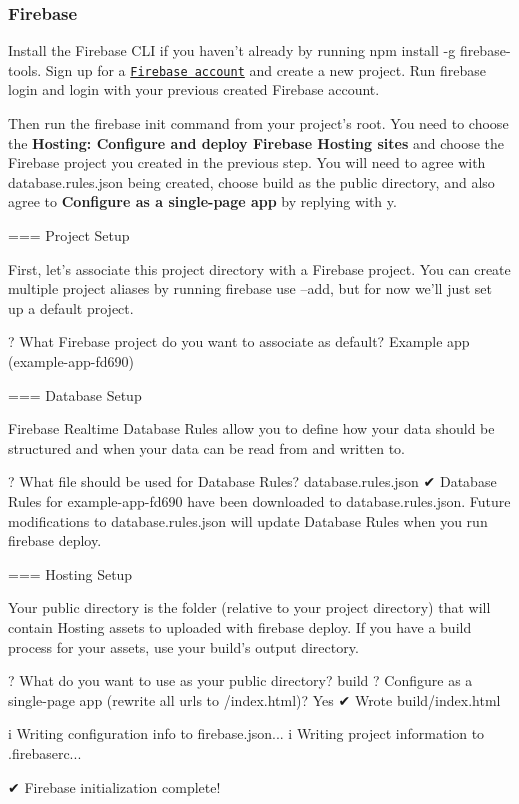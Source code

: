 \subsubsection*{Firebase}

Install the Firebase C\+LI if you haven’t already by running {\ttfamily npm install -\/g firebase-\/tools}. Sign up for a \href{https://console.firebase.google.com/}{\tt Firebase account} and create a new project. Run {\ttfamily firebase login} and login with your previous created Firebase account.

Then run the {\ttfamily firebase init} command from your project’s root. You need to choose the {\bfseries Hosting\+: Configure and deploy Firebase Hosting sites} and choose the Firebase project you created in the previous step. You will need to agree with {\ttfamily database.\+rules.\+json} being created, choose {\ttfamily build} as the public directory, and also agree to {\bfseries Configure as a single-\/page app} by replying with {\ttfamily y}.


\begin{DoxyCode}
=== Project Setup

First, let's associate this project directory with a Firebase project.
You can create multiple project aliases by running firebase use --add,
but for now we'll just set up a default project.

? What Firebase project do you want to associate as default? Example app (example-app-fd690)

=== Database Setup

Firebase Realtime Database Rules allow you to define how your data should be
structured and when your data can be read from and written to.

? What file should be used for Database Rules? database.rules.json
✔  Database Rules for example-app-fd690 have been downloaded to database.rules.json.
Future modifications to database.rules.json will update Database Rules when you run
firebase deploy.

=== Hosting Setup

Your public directory is the folder (relative to your project directory) that
will contain Hosting assets to uploaded with firebase deploy. If you
have a build process for your assets, use your build's output directory.

? What do you want to use as your public directory? build
? Configure as a single-page app (rewrite all urls to /index.html)? Yes
✔  Wrote build/index.html

i  Writing configuration info to firebase.json...
i  Writing project information to .firebaserc...

✔  Firebase initialization complete!
\end{DoxyCode}


